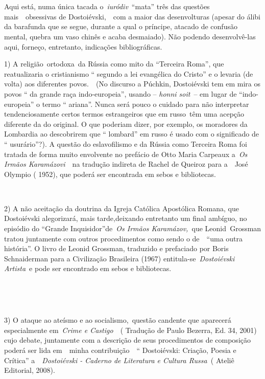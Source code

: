 \emph{~}

\emph{~}

Aqui está, numa única tacada o~\emph{iuródiv}~``mata'' três das questões
mais~~obsessivas de Dostoiévski,~~com a maior das desenvolturas (apesar
do álibi da barafunda que se segue, durante a qual o príncipe, atacado
de confusão mental, quebra um vaso chinês e acaba desmaiado). Não
podendo desenvolvê-las aqui, forneço, entretanto, indicações
bibliográficas.

1) A religião~ortodoxa~da Rússia como mito da ``Terceira Roma'', que
reatualizaria o cristianismo `` segundo a lei evangélica do Cristo'' e o
levaria (de volta) aos diferentes povos.~~(No discurso a Púchkin,
Dostoiévski tem em mira os povos `` da grande raça indo-europeia'',
usando -- \emph{honni soit}~-- em lugar de ``indo-europeia'' o termo ``
ariana''. Nunca será pouco o cuidado para não interpretar
tendenciosamente certos termos estrangeiros que em russo~têm uma acepção
diferente da do original. O que poderiam dizer, por exemplo, os
moradores da Lombardia ao descobrirem que `` lombard'' em russo é usado
com o significado de `` usurário''?). A questão do eslavofilismo e da
Rússia como Terceira Roma foi tratada de forma muito envolvente no
prefácio de Otto Maria Carpeaux a~\emph{Os Irmãos Karamázovi}~~na
tradução indireta de Rachel de Queiroz para a~~José Olympio ( 1952), que
poderá ser encontrada em sebos e bibliotecas.

~

2) A não aceitação da doutrina da Igreja Católica Apostólica Romana, que
Dostoiévski alegorizará, mais tarde,deixando entretanto um final
ambíguo, no episódio do ``Grande Inquisidor''de~\emph{Os Irmãos
Karamázov,~}que Leonid\emph{~}Grossman tratou juntamente com outros
procedimentos como sendo o de~~``uma outra história''. O livro de Leonid
Grossman, traduzido e prefaciado por Boris Schnaiderman para a
Civilização Brasileira (1967) entitula-se~\emph{Dostoiévski Artista}~e
pode ser encontrado em sebos e bibliotecas.

~

\emph{~}

3) O ataque ao ateísmo e ao socialismo,~questão candente que aparecerá
especialmente em~\emph{Crime e Castigo}~~( Tradução de Paulo Bezerra,
Ed. 34, 2001) cujo debate, juntamente com a descrição de seus
procedimentos de composição poderá ser lida em~~minha contribuição~~``
Dostoiévski: Criação, Poesia e Crítica'' a~~\emph{Dostoiévski - Caderno
de Literatura e Cultura Russa~}( Ateliê Editorial, 2008).

